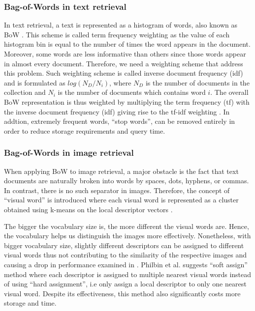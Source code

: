 \subsubsection{Bag-of-Words in text retrieval}\label{section:bow_text}
In text retrieval, a text is represented as a histogram of words, also known as BoW \cite{4}. This scheme is called term frequency weighting as the value of each histogram bin is equal to the number of times the word appears in the document.
Moreover, some words are less informative than others since those words appear in almost every document. Therefore, we need a weighting scheme that address this problem. Such weighting scheme is called inverse document frequency (idf) and is formulated as $log(N_{D} / N_{i})$, where $N_{D}$ is the number of documents in the collection and $N_{i}$ is the number of documents which contains word $i$. The overall BoW representation is thus weighted by multiplying the term frequency (tf) with the inverse document frequency (idf) giving rise to the tf-idf weighting \cite{4}. In addtion, extremely frequent words, ``stop words'', can be removed entirely in order to reduce storage requirements and query time.


\subsubsection{Bag-of-Words in image retrieval} \label{section:bow_image}
When applying BoW to image retrieval, a major obstacle is the fact that text documents are naturally broken into words by spaces, dots, hyphens, or commas. In contrast, there is no such separator in images. Therefore, the concept of ``visual word'' is introduced where each visual word is represented as a cluster obtained using k-means on the local descriptor vectors \cite{3}.

The bigger the vocabulary size is, the more different the visual words are. Hence, the vocabulary helps us distinguish the images more effectively. Nonetheless, with bigger vocabulary size, slightly different descriptors can be assigned to different visual words thus not contributing to the similarity of the respective images and causing a drop in performance examined in \cite{5, 6, 7}. Philbin et al. \cite{7} suggests ``soft assign'' method where each descriptor is assigned to multiple nearest visual words instead of using ``hard assignment'', i.e only assign a local descriptor to only one nearest visual word. Despite its effectiveness, this method also significantly costs more storage and time.


